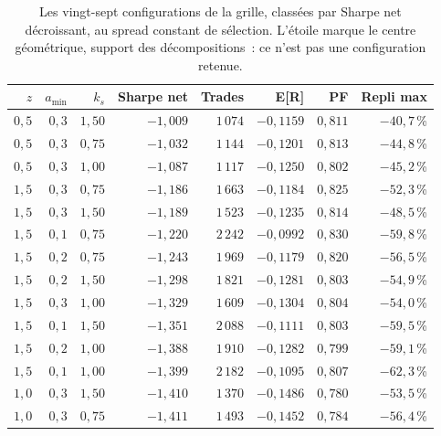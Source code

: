 \begin{table}[htbp]
\centering
\footnotesize
\caption{Les vingt-sept configurations de la grille, classées par Sharpe net décroissant, au spread constant de sélection. L'étoile marque le centre géométrique, support des décompositions~: ce n'est pas une configuration retenue.}
\label{tab:x10_grid27}
\begin{tabular}{r r r r r r r r}
\toprule
$z$ & $a_{\min}$ & $k_s$ & \textbf{Sharpe net} & \textbf{Trades} & \textbf{E[R]} & \textbf{PF} & \textbf{Repli max} \\
\midrule
$0{,}5$ & $0{,}3$ & $1{,}50$ & $-1{,}009$ & $1\,074$ & $-0{,}1159$ & $0{,}811$ & $-40{,}7$\,\% \\
$0{,}5$ & $0{,}3$ & $0{,}75$ & $-1{,}032$ & $1\,144$ & $-0{,}1201$ & $0{,}813$ & $-44{,}8$\,\% \\
$0{,}5$ & $0{,}3$ & $1{,}00$ & $-1{,}087$ & $1\,117$ & $-0{,}1250$ & $0{,}802$ & $-45{,}2$\,\% \\
$1{,}5$ & $0{,}3$ & $0{,}75$ & $-1{,}186$ & $1\,663$ & $-0{,}1184$ & $0{,}825$ & $-52{,}3$\,\% \\
$1{,}5$ & $0{,}3$ & $1{,}50$ & $-1{,}189$ & $1\,523$ & $-0{,}1235$ & $0{,}814$ & $-48{,}5$\,\% \\
$1{,}5$ & $0{,}1$ & $0{,}75$ & $-1{,}220$ & $2\,242$ & $-0{,}0992$ & $0{,}830$ & $-59{,}8$\,\% \\
$1{,}5$ & $0{,}2$ & $0{,}75$ & $-1{,}243$ & $1\,969$ & $-0{,}1179$ & $0{,}820$ & $-56{,}5$\,\% \\
$1{,}5$ & $0{,}2$ & $1{,}50$ & $-1{,}298$ & $1\,821$ & $-0{,}1281$ & $0{,}803$ & $-54{,}9$\,\% \\
$1{,}5$ & $0{,}3$ & $1{,}00$ & $-1{,}329$ & $1\,609$ & $-0{,}1304$ & $0{,}804$ & $-54{,}0$\,\% \\
$1{,}5$ & $0{,}1$ & $1{,}50$ & $-1{,}351$ & $2\,088$ & $-0{,}1111$ & $0{,}803$ & $-59{,}5$\,\% \\
$1{,}5$ & $0{,}2$ & $1{,}00$ & $-1{,}388$ & $1\,910$ & $-0{,}1282$ & $0{,}799$ & $-59{,}1$\,\% \\
$1{,}5$ & $0{,}1$ & $1{,}00$ & $-1{,}399$ & $2\,182$ & $-0{,}1095$ & $0{,}807$ & $-62{,}3$\,\% \\
$1{,}0$ & $0{,}3$ & $1{,}50$ & $-1{,}410$ & $1\,370$ & $-0{,}1486$ & $0{,}780$ & $-53{,}5$\,\% \\
$1{,}0$ & $0{,}3$ & $0{,}75$ & $-1{,}411$ & $1\,493$ & $-0{,}1452$ & $0{,}784$ & $-56{,}4$\,\% \\

\end{tabular}
\end{table}
